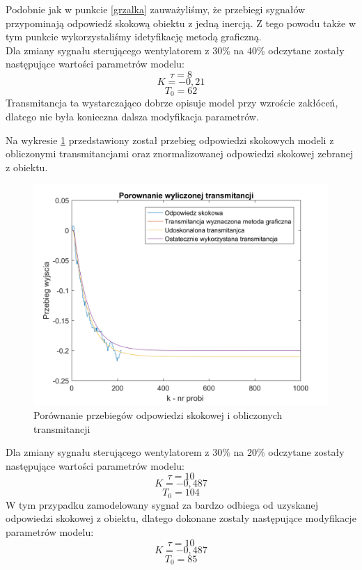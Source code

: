 \documentclass[12pt, a4paper]{article}
\begin{document}
Podobnie jak w punkcie \ref{grzalka} zauważyliśmy, że przebiegi sygnałów przypominają odpowiedź skokową obiektu z jedną inercją. Z tego powodu także w tym punkcie wykorzystaliśmy idetyfikację metodą graficzną.\\
Dla zmiany sygnału sterującego wentylatorem z $30\%$ na $40\%$ odczytane zostały następujące wartości parametrów modelu:
\[\tau=8\]
\[K=-0,21\]
\[T_{0}=62\]
Transmitancja ta wystarczająco dobrze opisuje model przy wzroście zakłóceń, dlatego nie była konieczna dalsza modyfikacja parametrów.

Na wykresie \ref{fig:transmi_wg} przedstawiony został przebieg odpowiedzi skokowych modeli z obliczonymi transmitancjami oraz znormalizowanej odpowiedzi skokowej zebranej z obiektu.
\begin{figure}[H]
	\centering
	\includegraphics[width=0.9\linewidth]{transmi_wg}
	\caption  {Porównanie przebiegów odpowiedzi skokowej i obliczonych transmitancji}
	\label{fig:transmi_wg}
\end{figure}
Dla zmiany sygnału sterującego wentylatorem z $30\%$ na $20\%$ odczytane zostały następujące wartości parametrów modelu:
\[\tau=10\]
\[K=-0,487\]
\[T_{0}=104\]
W tym przypadku zamodelowany sygnał za bardzo odbiega od uzyskanej odpowiedzi skokowej z obiektu, dlatego dokonane zostały następujące modyfikacje parametrów modelu:
\[\tau=10\]
\[K=-0,487\]
\[T_{0}=85\]
\end{document}
